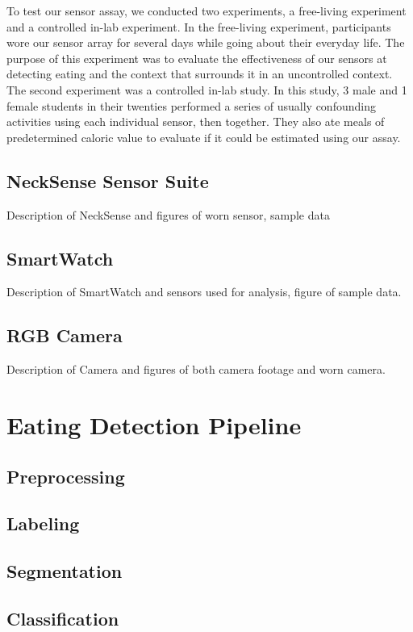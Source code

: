 \documentclass[conference]{IEEEtran}
\begin{document}
To test our sensor assay, we conducted two experiments, a free-living experiment and a controlled in-lab experiment. In the free-living experiment, participants wore our sensor array for several days while going about their everyday life. The purpose of this experiment was to evaluate the effectiveness of our sensors at detecting eating and the context that surrounds it in an uncontrolled context. The second experiment was a controlled in-lab study. In this study, 3 male and 1 female students in their twenties performed a series of usually confounding activities using each individual sensor, then together. They also ate meals of predetermined caloric value to evaluate if it could be estimated using our assay.

\subsection{NeckSense Sensor Suite}
Description of NeckSense and figures of worn sensor, sample data
\subsection{SmartWatch}
Description of SmartWatch and sensors used for analysis, figure of sample data.
\subsection{RGB Camera}
Description of Camera and figures of both camera footage and worn camera.

\section{Eating Detection Pipeline}

\subsection{Preprocessing}

\subsection{Labeling}

\subsection{Segmentation}

\subsection{Classification}
\end{document}
